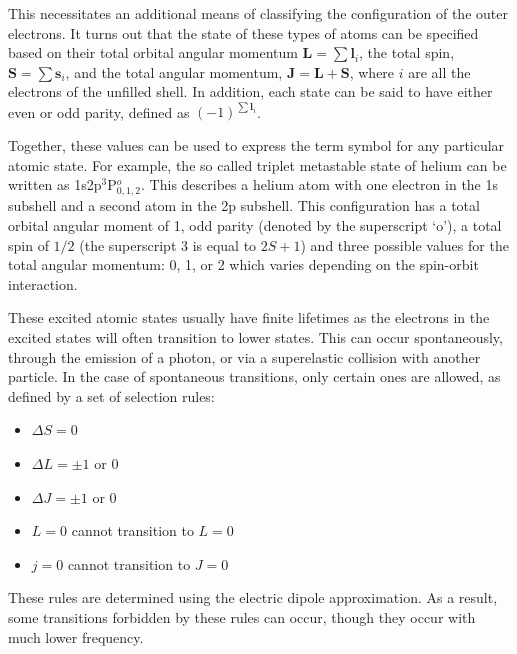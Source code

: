 {This necessitates an additional means of classifying the configuration of the
outer electrons. It turns out that the state of these types of atoms can be
specified based on their total orbital angular momentum $\bm{L}=\sum \bm{l}_i$,
the total spin, $\bm{S}=\sum \bm{s}_i$, and the total angular momentum,
$\bm{J}=\bm{L}+\bm{S}$, where $i$ are all the electrons of the unfilled shell.
In addition, each state can be said to have either even or odd parity, defined
as $(-1)^{\sum\bm{l}_i}$.

Together, these values can be used to express the term symbol for any particular
atomic state. For example, the so called triplet metastable state of helium can
be written as 1s2p$^3$P$^o_{0,1,2}$. This describes a helium atom with one
electron in the 1s subshell and a second atom in the 2p subshell. This
configuration has a total orbital angular moment of 1, odd parity (denoted by
the superscript `o'), a total spin of $1/2$ (the superscript $3$ is equal to
$2S+1$) and three possible values for the total angular momentum: 0, 1, or 2
which varies depending on the spin-orbit interaction.

These excited atomic states usually have finite lifetimes as the electrons in
the excited states will often transition to lower states. This can occur
spontaneously, through the emission of a photon, or via a superelastic collision
with another particle. In the case of spontaneous transitions, only certain ones
are allowed, as defined by a set of selection rules:
\begin{itemize}
  \item $\Delta S = 0$
  \item $\Delta L = \pm1$ or 0
  \item $\Delta J = \pm1$ or 0
  \item $L=0$ cannot transition to $L=0$
  \item $j=0$ cannot transition to $J=0$
\end{itemize}
These rules are determined using the electric dipole approximation. As a result,
some transitions forbidden by these rules can occur, though they occur with much
lower frequency.

}
